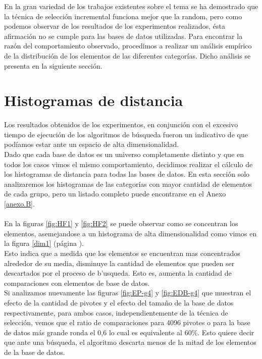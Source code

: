 En la gran variedad de los trabajos existentes sobre el tema se ha demostrado que la t\'ecnica de selecci\'on incremental funciona mejor que la random, pero como podemos observar de los resultados de los experimentos realizados, \'esta afirmaci\'on no se cumple para las bases de datos utilizadas. Para encontrar la raz\'on del comportamiento observado, procedimos a realizar un an\'alisis emp\'irico de la distribuci\'on de los elementos de las diferentes categor\'ias. Dicho an\'alisis se presenta en la siguiente secci\'on.


\section{Histogramas de distancia}
 
Los resultados obtenidos de los experimentos, en conjunci\'on con el excesivo tiempo de ejecuci\'on de los algoritmos de b\'usqueda fueron un indicativo de que pod\'iamos estar ante un espacio de alta dimensionalidad.\\

Dado que cada base de datos es un universo completamente distinto y que en todos los casos vimos el mismo comportamiento, decidimos realizar el c\'alculo de los histogramas de distancia para todas las bases de datos. En esta secci\'on solo analizaremos los histogramas de las categor\'ias con mayor cantidad de elementos de cada grupo, pero un listado completo puede encontrarse en el Anexo \ref{anexo.B}.\\\\

En la figuras \ref{fig:HF1} y \ref{fig:HF2} se puede observar como se concentran los elementos, asemejandose a un histograma de alta dimensionalidad como vimos en la figura \ref{dim1} (p\'agina \pageref{dim1}).\\

Esto indica que a medida que los elementos se encuentran mas concentrados alrededor de su media, disminuye la cantidad de elementos que pueden ser descartados por el proceso de b'usqueda. Esto es, aumenta la cantidad de comparaciones con elementos de base de datos.\\

Si analizamos nuevamente las figuras \ref{fig:EP-g4} y \ref{fig:EDB-g4} que muestran el efecto de la cantidad de pivotes y el efecto del tama\~no de la base de datos respectivamente, para ambos casos, independientemente de la t\'ecnica de selecci\'on, vemos que el ratio de comparaciones para 4096 pivotes o para la base de datos m\'as grande ronda el 0,6 lo cual es equivalente al 60\%. Esto quiere decir que ante una b\'usqueda, el algoritmo descarta menos de la mitad de los elementos de la base de datos.\\

